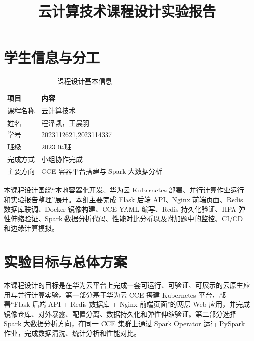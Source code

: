 \documentclass[bwprint]{report}
\title{云计算技术课程设计实验报告}
\begin{document}
\sloppy

\maketitle

\pagestyle{plain}
\tableofcontents
\newpage

\setcounter{page}{1}

\section{学生信息与分工}

\begin{table}[!htbp]
    \centering
    \caption{课程设计基本信息}
    \begin{tabular}{ll}
        \toprule[1.5pt]
        项目 & 内容 \\
        \midrule[1pt]
        课程名称 & 云计算技术 \\
        姓名 & 程泽凯，王晨羽 \\
        学号 & 2023112621,2023114337 \\
        班级 & 2023-04班 \\
        完成方式 & 小组协作完成 \\
        主要方向 & CCE 容器平台搭建与 Spark 大数据分析 \\
        \bottomrule[1.5pt]
    \end{tabular}
\end{table}

本课程设计围绕“本地容器化开发、华为云 Kubernetes 部署、并行计算作业运行和实验报告整理”展开。本组主要完成 Flask 后端 API、Nginx 前端页面、Redis 数据库联调、Docker 镜像构建、CCE YAML 编写、Redis 持久化验证、HPA 弹性伸缩验证、Spark 数据分析代码、性能对比分析以及附加题中的监控、CI/CD 和边缘计算模拟。

\section{实验目标与总体方案}

本课程设计的目标是在华为云平台上完成一套可运行、可验证、可展示的云原生应用与并行计算实验。第一部分基于华为云 CCE 搭建 Kubernetes 平台，部署“Flask 后端 API + Redis 数据库 + Nginx 前端页面”的两层 Web 应用，并完成镜像仓库、对外暴露、配置分离、数据持久化和弹性伸缩验证。第二部分选择 Spark 大数据分析方向，在同一 CCE 集群上通过 Spark Operator 运行 PySpark 作业，完成数据清洗、统计分析和性能对比。
\end{document}
